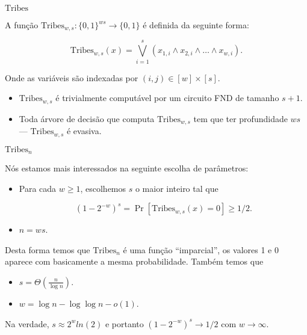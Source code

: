 \documentclass[landscape]{beamer}
\newcommand{\binalph}{\{0, 1\}}
\newcommand{\Tribes}{\text{Tribes}}
\begin{document}

\begin{frame} {$\Tribes$}

A função $\Tribes_{w, s}: \binalph^{ws} \to \binalph$ é definida da seguinte forma:

\begin{equation*}
	\Tribes_{w, s}(x) = \bigvee_{i = 1}^{s} (x_{1, i} \land x_{2, i} \land \dots \land x_{w, i}).
\end{equation*}

Onde as variáveis são indexadas por $(i, j) \in [w] \times [s]$.

\begin{itemize}

	\item $\Tribes_{w, s}$ é trivialmente computável por um circuito FND de tamanho $s + 1$.
	
	\item Toda árvore de decisão que computa $\Tribes_{w, s}$ tem que ter profundidade $ws$ --- $\Tribes_{w, s}$ é evasiva.

\end{itemize}

\end{frame}


\begin{frame} {$\Tribes_{n}$}

Nós estamos mais interessados na seguinte escolha de parâmetros:

\begin{itemize}

	\item Para cada $w \geq 1$, escolhemos $s$ o maior inteiro tal que
	
	\begin{equation*}
		(1 - 2^{-w})^{s} = \Pr[\Tribes_{w, s}(x) = 0] \geq 1/2.
	\end{equation*}
	
	\item $n = ws$.

\end{itemize}

Desta forma temos que $\Tribes_{n}$ é uma função ``imparcial'', os valores 1 e 0 aparece com basicamente a mesma probabilidade. Também temos que

\begin{itemize}

	\item $s = \Theta(\frac{n}{\log n})$.
	
	\item $w = \log n - \log\log n - o(1)$.

\end{itemize}

Na verdade, $s \approx 2^{w}ln(2)$ e portanto $(1 - 2^{-w})^{s} \rightarrow 1/2$ com $w \rightarrow \infty$.

\end{frame}
\end{document}
